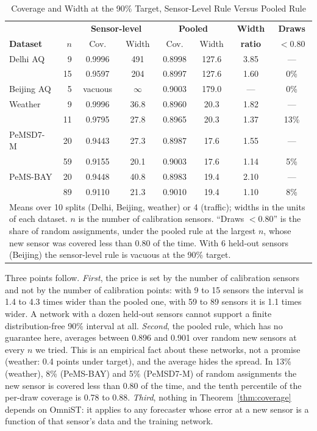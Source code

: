 \begin{table}[htbp]
\caption{Coverage and Width at the 90\% Target, Sensor-Level Rule Versus Pooled Rule}
\label{tab:bound}
\centering
\footnotesize
\setlength{\tabcolsep}{3pt}
\begin{tabular}{lrcccccc}
\toprule
 & & \multicolumn{2}{c}{\textbf{Sensor-level}} & \multicolumn{2}{c}{\textbf{Pooled}} & \textbf{Width} & \textbf{Draws} \\
\textbf{Dataset} & $n$ & Cov. & Width & Cov. & Width & \textbf{ratio} & \textbf{$<0.80$} \\
\midrule
Delhi AQ   &  9 & 0.9996 & 491 & 0.8998 & 127.6 & 3.85 & --- \\
           & 15 & 0.9597 & 204 & 0.8997 & 127.6 & 1.60 & 0\% \\
Beijing AQ &  5 & vacuous & $\infty$ & 0.9003 & 179.0 & --- & 0\% \\
Weather    &  9 & 0.9996 & 36.8 & 0.8960 & 20.3 & 1.82 & --- \\
           & 11 & 0.9795 & 27.8 & 0.8965 & 20.3 & 1.37 & 13\% \\
PeMSD7-M   & 20 & 0.9443 & 27.3 & 0.8987 & 17.6 & 1.55 & --- \\
           & 59 & 0.9155 & 20.1 & 0.9003 & 17.6 & 1.14 & 5\% \\
PeMS-BAY   & 20 & 0.9448 & 40.8 & 0.8983 & 19.4 & 2.10 & --- \\
           & 89 & 0.9110 & 21.3 & 0.9010 & 19.4 & 1.10 & 8\% \\
\bottomrule
\multicolumn{8}{p{0.93\columnwidth}}{\footnotesize Means over 10 splits (Delhi, Beijing, weather) or 4
(traffic); widths in the units of each dataset. $n$ is the number of calibration sensors. ``Draws
$<0.80$'' is the share of random assignments, under the pooled rule at the largest $n$, whose new
sensor was covered less than 0.80 of the time. With 6 held-out sensors (Beijing) the sensor-level rule
is vacuous at the 90\% target.} \\
\end{tabular}
\end{table}



Three points follow. \emph{First}, the price is set by the number of calibration sensors and not by
the number of calibration points: with 9 to 15 sensors the interval is 1.4 to 4.3 times wider than the
pooled one, with 59 to 89 sensors it is 1.1 times wider. A network with a dozen held-out sensors cannot
support a finite distribution-free 90\% interval at all. \emph{Second}, the pooled rule, which has no
guarantee here, averages between 0.896 and 0.901 over random new sensors at every $n$ we tried. This is an empirical fact about these networks, not a promise (weather: 0.4 points under target), and the average hides the spread. In 13\% (weather), 8\% (PeMS-BAY) and 5\% (PeMSD7-M) of random
assignments the new sensor is covered less than 0.80 of the time, and the tenth percentile of the per-draw
coverage is 0.78 to 0.88. \emph{Third}, nothing in Theorem~\ref{thm:coverage} depends on OmniST: it applies to
any forecaster whose error at a new sensor is a function of that sensor's data and the training network.
